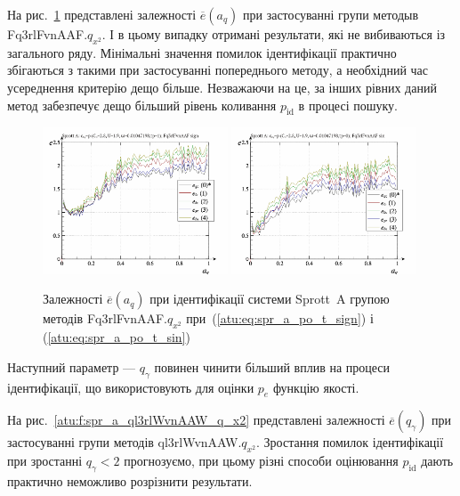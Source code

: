 На рис.~\ref{atu:f:spr_a_a_q_Fq3rlFvnAAF_q_x2} представлені залежності
$ \overline{e} (a_q) $ при застосуванні групи методыв Fq3rlFvnAAF.$q_{x^2} $.
І в цьому випадку отримані результати, які не
вибиваються із загального ряду. Мінімальні значення помилок
ідентифікації практично збігаються з такими при застосуванні
попереднього методу, а необхідний час усереднення критерію
дещо більше. Незважаючи на це, за інших рівних даний метод
забезпечує дещо більший рівень коливання
$ p_\mathrm{id} $ в процесі пошуку.


\begin{figure}[htb!]
  \centerline{
    \includegraphics[width=0.49\textwidth]{p/cha/spr_a/Fq3rlFvnAAF_x2/sprott_a_id-p_a_q_sign.png}
    \hfill
    \includegraphics[width=0.49\textwidth]{p/cha/spr_a/Fq3rlFvnAAF_x2/sprott_a_id-p_a_q_sin.png}
  }
\caption{Залежності $ \overline{e} (a_q) $ при ідентифікації системи Sprott~A групою методів Fq3rlFvnAAF.$q_{x^2} $ при~(\ref{atu:eq:spr_a_po_t_sign}) і (\ref{atu:eq:spr_a_po_t_sin})}
  \label{atu:f:spr_a_a_q_Fq3rlFvnAAF_q_x2}
\end{figure}

Наступний параметр ---
$ q_\gamma $ повинен чинити більший вплив на процеси ідентифікації,
що використовують для оцінки
$ p_e $ функцію якості.

На рис.~\ref{atu:f:spr_a_ql3rlWvnAAW_q_x2} представлені залежності
$\overline{e} (q_\gamma) $ при застосуванні групи методів ql3rlWvnAAW.$q_{x^2} $.
Зростання помилок ідентифікації при зростанні
$q_\gamma <2 $ прогнозуємо, при цьому різні способи оцінювання
$p_\mathrm{id} $ дають практично неможливо розрізнити результати.


